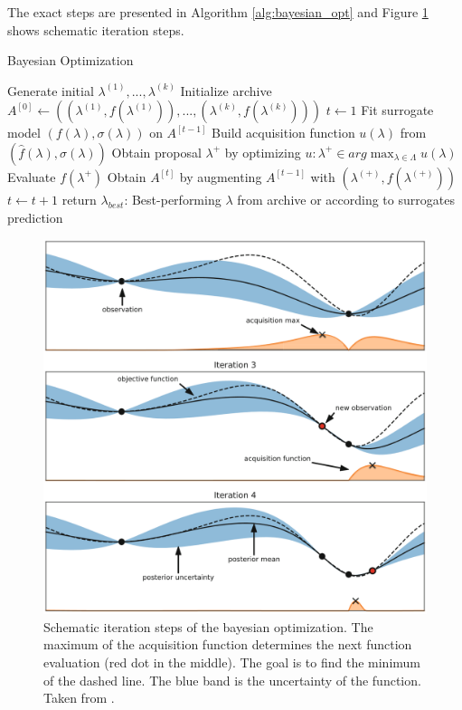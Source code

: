 The exact steps are presented in Algorithm \ref{alg:bayesian_opt} and Figure \ref{fig:bayesian_optimization} shows schematic iteration steps.

\begin{algorithm}[htbp!]
	\caption{Bayesian Optimization}\label{alg:bayesian_opt}
	\begin{algorithmic}
		\State Generate initial $\lambda^{(1)}, ..., \lambda^{(k)} $
		\State Initialize archive $A^{[0]} \gets ((\lambda^{(1)}, f(\lambda^{(1)})), ..., (\lambda^{(k)}, f(\lambda^{(k)})))$
		\State $ t \gets 1 $ 
			\State Fit surrogate model $ (f(\lambda), \sigma(\lambda)) $ on $ A^{[t-1]} $
			\State Build acquisition function $ u(\lambda) $ from $ (\hat{f}(\lambda), \sigma(\lambda)) $
			\State Obtain proposal $ \lambda^{+} $ by optimizing $ u: \lambda^+ \in arg\max_{\lambda \in \Lambda} u(\lambda) $
			\State Evaluate $ f(\lambda^+)$
			\State Obtain $A^[t]$ by augmenting $ A^{[t-1]} $ with $ (\lambda^{(+)}, f(\lambda^{(+)})) $
			\State $ t \gets t+1 $
		\EndWhile
		\State return $ \lambda_{best} $: Best-performing $\lambda$ from archive or according to surrogates prediction
	\end{algorithmic}
\end{algorithm}

\begin{figure}[htbp!]
	\centering
	\includegraphics[scale=0.35]{figures/bayesian_optimization.png}
	\caption{ Schematic iteration steps of the bayesian optimization. The maximum of the acquisition function determines the next function evaluation (red dot in the middle). The goal is to find the minimum of the dashed line. The blue band is the uncertainty of the function. Taken from \cite{feurer2019hyperparameter}. }
	\label{fig:bayesian_optimization}
\end{figure}



